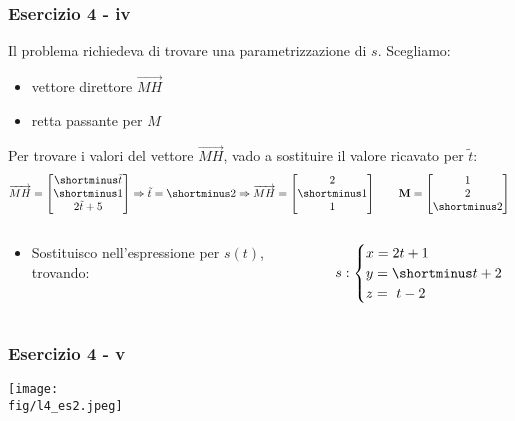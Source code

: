 \documentclass{beamer}
\newcommand{\fig}{./figures} %
\begin{document}
\begin{frame}
\frametitle{Esercizio 4 - iv}
Il problema richiedeva di trovare una parametrizzazione di $s$. Scegliamo:
\begin{itemize}
        \item vettore direttore $\overrightarrow{MH}$
        \item retta passante per $M$
\end{itemize}

Per trovare i valori del vettore $\overrightarrow{MH}$, vado a sostituire il valore ricavato
per $\tilde t$:
$$
\overrightarrow{MH}
    =
    \begin{bmatrix}\shortminus \tilde t \\ \shortminus 1 \\ 2 \tilde t+5 \end{bmatrix}
\Rightarrow
\tilde t = \shortminus 2
\Rightarrow
\overrightarrow{MH}
    =
    \begin{bmatrix}2 \\ \shortminus 1 \\ 1\end{bmatrix}
        \qquad
    \mathbf M
    =
    \begin{bmatrix}1 \\ 2 \\ \shortminus 2 \end{bmatrix}
$$
\begin{columns}
\begin{column}{0.48\textwidth}
\begin{itemize}
\item Sostituisco nell'espressione per $s(t)$, trovando:
\end{itemize}
\end{column}
\begin{column}{0.48\textwidth}
\begin{displaymath}
s:
\begin{cases}
x  = 2t + 1 \\
y  = \shortminus t  + 2 \\
z  = \ t  - 2
\end{cases}
\end{displaymath}
\end{column}
\end{columns}
\end{frame}
%

\begin{frame}
\frametitle{Esercizio 4 - v}
\begin{center}
\texttt{[image: \\fig/l4\_es2.jpeg]}
\end{center}
\end{frame}
%
\end{document}
